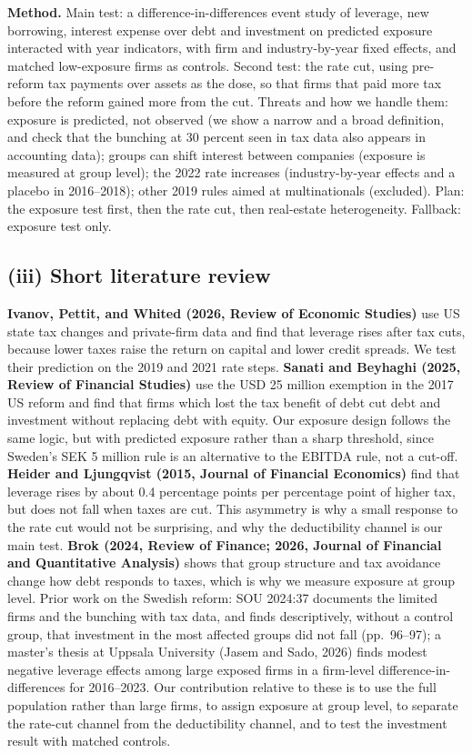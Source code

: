 \documentclass[12pt,a4paper]{article}
\begin{document}
\textbf{Method.} Main test: a difference-in-differences event study of leverage, new borrowing, interest expense over debt and investment on predicted exposure interacted with year indicators, with firm and industry-by-year fixed effects, and matched low-exposure firms as controls. Second test: the rate cut, using pre-reform tax payments over assets as the dose, so that firms that paid more tax before the reform gained more from the cut. Threats and how we handle them: exposure is predicted, not observed (we show a narrow and a broad definition, and check that the bunching at 30 percent seen in tax data also appears in accounting data); groups can shift interest between companies (exposure is measured at group level); the 2022 rate increases (industry-by-year effects and a placebo in 2016--2018); other 2019 rules aimed at multinationals (excluded). Plan: the exposure test first, then the rate cut, then real-estate heterogeneity. Fallback: exposure test only.

\subsection{(iii) Short literature review}

\textbf{Ivanov, Pettit, and Whited (2026, Review of Economic Studies)} use US state tax changes and private-firm data and find that leverage rises after tax cuts, because lower taxes raise the return on capital and lower credit spreads. We test their prediction on the 2019 and 2021 rate steps. \textbf{Sanati and Beyhaghi (2025, Review of Financial Studies)} use the USD 25 million exemption in the 2017 US reform and find that firms which lost the tax benefit of debt cut debt and investment without replacing debt with equity. Our exposure design follows the same logic, but with predicted exposure rather than a sharp threshold, since Sweden's SEK 5 million rule is an alternative to the EBITDA rule, not a cut-off. \textbf{Heider and Ljungqvist (2015, Journal of Financial Economics)} find that leverage rises by about 0.4 percentage points per percentage point of higher tax, but does not fall when taxes are cut. This asymmetry is why a small response to the rate cut would not be surprising, and why the deductibility channel is our main test. \textbf{Brok (2024, Review of Finance; 2026, Journal of Financial and Quantitative Analysis)} shows that group structure and tax avoidance change how debt responds to taxes, which is why we measure exposure at group level. Prior work on the Swedish reform: SOU 2024:37 documents the limited firms and the bunching with tax data, and finds descriptively, without a control group, that investment in the most affected groups did not fall (pp.~96--97); a master's thesis at Uppsala University (Jasem and Sado, 2026) finds modest negative leverage effects among large exposed firms in a firm-level difference-in-differences for 2016--2023. Our contribution relative to these is to use the full population rather than large firms, to assign exposure at group level, to separate the rate-cut channel from the deductibility channel, and to test the investment result with matched controls.
\end{document}
